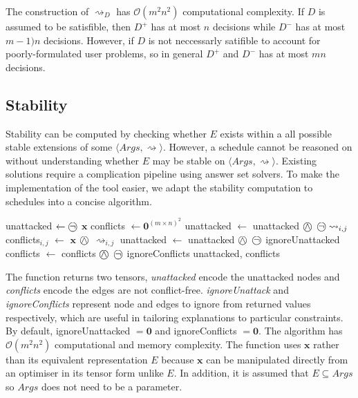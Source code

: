 The construction of $\rightsquigarrow_D$ has $\mathcal{O}(m^2n^2)$ computational complexity. If $D$ is assumed to be satisfible, then $D^+$ has at most $n$ decisions while $D^-$ has at most $m-1)n$ decisions. However, if $D$ is not neccessarly satifible to account for poorly-formulated user problems, so in general $D^+$ and $D^-$ has at most $mn$ decisions.

\subsection{Stability}

Stability can be computed by checking whether $E$ exists within a all possible stable extensions of some $\langle Args, \rightsquigarrow\rangle$. However, a schedule cannot be reasoned on without understanding whether $E$ may be stable on $\langle Args, \rightsquigarrow\rangle$. Existing solutions require a complication pipeline using answer set solvers. To make the implementation of the tool easier, we adapt the stability computation to schedules into a concise algorithm.

\begin{algorithm}[h!]
	\begin{algorithmic}[1]
			\State unattacked $\gets\incircbin{\neg}$ $\mathbf{x}$
			\State conflicts $\gets\mathbf{0}^{(m\times n)^2}$
						\State unattacked $\gets$ unattacked $\incircbin{\land}$ $\incircbin{\neg}\rightsquigarrow_{i,j}$
						\State conflicts$_{i,j}$ $\gets$ $\mathbf{x}$ $\incircbin{\land}$ $\rightsquigarrow_{i,j}$ 
					\EndIf
				\EndFor
			\EndFor
			\State unattacked $\gets$ unattacked $\incircbin{\land}$ $\incircbin{\neg}$ ignoreUnattacked
			\State conflicts $\gets$ conflicts $\incircbin{\land}$ $\incircbin{\neg}$ ignoreConflicts
			\State \Return unattacked, conflicts
		\EndFunction
	\end{algorithmic}
\end{algorithm}

The function returns two tensors, \emph{unattacked} encode the unattacked nodes and \emph{conflicts} encode the edges are not conflict-free. \emph{ignoreUnattack} and \emph{ignoreConflicts} represent node and edges to ignore from returned values respectively, which are useful in tailoring explanations to particular constraints. By default, ignoreUnattacked $=\mathbf{0}$ and ignoreConflicts $=\mathbf{0}$. The algorithm has $\mathcal{O}(m^2n^2)$ computational and memory complexity. The function uses $\mathbf{x}$ rather than its equivalent representation $E$ because $\mathbf{x}$ can be manipulated directly from an optimiser in its tensor form unlike $E$. In addition, it is assumed that $E\subseteq Args$ so $Args$ does not need to be a parameter.

